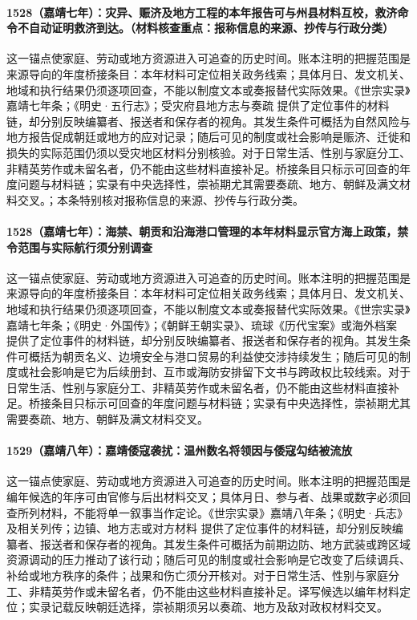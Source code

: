 \paragraph{1528（嘉靖七年）：灾异、赈济及地方工程的本年报告可与州县材料互校，救济命令不自动证明救济到达。（材料核查重点：报称信息的来源、抄传与行政分类）} 这一锚点使家庭、劳动或地方资源进入可追查的历史时间。账本注明的把握范围是来源导向的年度桥接条目：本年材料可定位相关政务线索；具体月日、发文机关、地域和执行结果仍须逐项回查，不能以制度文本或奏报替代实际效果。《世宗实录》嘉靖七年条；《明史·五行志》；受灾府县地方志与奏疏 提供了定位事件的材料链，却分别反映编纂者、报送者和保存者的视角。其发生条件可概括为自然风险与地方报告促成朝廷或地方的应对记录；随后可见的制度或社会影响是赈济、迁徙和损失的实际范围仍须以受灾地区材料分别核验。对于日常生活、性别与家庭分工、非精英劳作或未留名者，仍不能由这些材料直接补足。桥接条目只标示可回查的年度问题与材料链；实录有中央选择性，崇祯期尤其需要奏疏、地方、朝鲜及满文材料交叉。；本条特别核对报称信息的来源、抄传与行政分类。

\paragraph{1528（嘉靖七年）：海禁、朝贡和沿海港口管理的本年材料显示官方海上政策，禁令范围与实际航行须分别调查} 这一锚点使家庭、劳动或地方资源进入可追查的历史时间。账本注明的把握范围是来源导向的年度桥接条目：本年材料可定位相关政务线索；具体月日、发文机关、地域和执行结果仍须逐项回查，不能以制度文本或奏报替代实际效果。《世宗实录》嘉靖七年条；《明史·外国传》；《朝鲜王朝实录》、琉球《历代宝案》或海外档案 提供了定位事件的材料链，却分别反映编纂者、报送者和保存者的视角。其发生条件可概括为朝贡名义、边境安全与港口贸易的利益使交涉持续发生；随后可见的制度或社会影响是它为后续册封、互市或海防安排留下文书与跨政权比较线索。对于日常生活、性别与家庭分工、非精英劳作或未留名者，仍不能由这些材料直接补足。桥接条目只标示可回查的年度问题与材料链；实录有中央选择性，崇祯期尤其需要奏疏、地方、朝鲜及满文材料交叉。

\paragraph{1529（嘉靖八年）：嘉靖倭寇袭扰：温州数名将领因与倭寇勾结被流放} 这一锚点使家庭、劳动或地方资源进入可追查的历史时间。账本注明的把握范围是编年候选的年序可由官修与后出材料交叉；具体月日、参与者、战果或数字必须回查所列材料，不能将单一叙事当作定论。《世宗实录》嘉靖八年条；《明史·兵志》及相关列传；边镇、地方志或对方材料 提供了定位事件的材料链，却分别反映编纂者、报送者和保存者的视角。其发生条件可概括为前期边防、地方武装或跨区域资源调动的压力推动了该行动；随后可见的制度或社会影响是它改变了后续调兵、补给或地方秩序的条件；战果和伤亡须分开核对。对于日常生活、性别与家庭分工、非精英劳作或未留名者，仍不能由这些材料直接补足。译写候选以编年材料定位；实录记载反映朝廷选择，崇祯期须另以奏疏、地方及敌对政权材料交叉。

